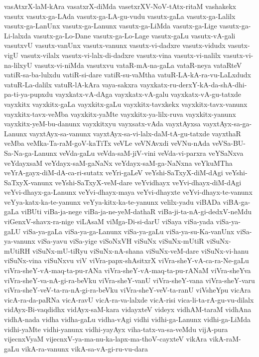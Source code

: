 {vasAtxrX-laM-kAra
vasatxrX-diMda
vasetxrXV-NoV-tAtx-ritaM
vashakekx
vasutx
vasutx-ga-LAda
vasutx-ga-LA-gu-vudu
vasutx-gaLa
vasutx-ga-Lalilx
vasutx-ga-LanUnx
vasutx-ga-Lanunx
vasutx-ga-LiMda
vasutx-ga-Lige
vasutx-ga-Li-lalxda
vasutx-ga-Lo-Dane
vasutx-ga-Lo-Lage
vasutx-gaLu
vasutx-vA-gali
vasutxvU
vasutx-vanUnx
vasutx-vanunx
vasutx-vi-dadxre
vasutx-vidudx
vasutx-vigU
vasutx-vilalx
vasutx-vi-lalx-di-dadxre
vasutx-vina
vasutx-vi-nalilx
vasutx-vi-na-lilxyU
vasutx-vi-niMda
vasutxvu
vataR-mA-na-gaLa
vataR-neya
vataRteV
vatiR-sa-ba-lulxdu
vatiR-si-dare
vatiR-su-vaMtha
vatuR-LA-kA-ra-vu-LaLxdudx
vatuR-La-dalilx
vatuR-lA-kAra
vaya-sakxra
vayxkatx-ru-derxY-kA-da-shA-dhi-pa-ti-ya-pupxdu
vayxkatx-vA-dAga
vayxkatx-vA-galu
vayxkatx-vA-gu-tatxde
vayxkitx
vayxkitx-gaLa
vayxkitx-gaLu
vayxkitx-tavxkekx
vayxkitx-tavx-vanunx
vayxkitx-tavx-veMba
vayxkitx-yaMte
vayxkitx-ya-lilx-ruva
vayxkitx-yanunx
vayxkitx-yeM-bu-danunx
vayxkitxyu
vayxsatx-vAda
vayxtAyxsa
vayxtAyx-sa-ga-Lanunx
vayxtAyx-sa-vanunx
vayxtAyx-sa-vi-lalx-daM-tA-gu-tatxde
vayxthaR
veMba
veMka-Ta-raM-goV-kaTiTx
veVLe
veVNAvxdi
veVNu-nAda
veVSa-BU-Sa-Na-ga-Lanunx
veVda-gaLu
veVda-saM-jiV-vini
veVda-vi-parxra
veYSaNxva
veYdayxsaM
veYdayx-saM-gaNaNx
veYdayx-saM-ga-NaNxna
veYkuMTha
veYrA-gayx-diM-dA-ca-ri-sutatx
veYri-gaLeV
veYshi-SaTxyX-diM-dAgi
veYshi-SaTxyX-vanunx
veYshi-SaTxyX-veM-dare
veYvidhayx
veYvi-dhayx-diM-dAgi
veYvi-dhayx-ga-Lanunx
veYvi-dhayx-maya
veYvi-dhayxte
veYvi-dhayx-te-vanunx
veYya-katx-ka-te-yanunx
veYya-kitx-ka-te-yanunx
velilx-yadu
viBADa
viBA-ga-gaLa
viBUti
viBa-ja-nege
viBa-ja-ne-yeM-dathaR
viBa-ji-ta-nA-gi-dedxV-neMdu
viGenxV-shavx-ra-nige
viLAsaM
viMga-Di-si-darU
viSaya
viSa-yada
viSa-ya-gaLU
viSa-ya-gaLa
viSa-ya-ga-Lanunx
viSa-ya-gaLu
viSa-ya-su-Ka-vanUnx
viSa-ya-vanunx
viSa-yavu
viSa-yige
viSoNxVH
viSuNx
viSuNx-mUtiR
viSuNx-mUtiRH
viSuNx-mU-tiRyu
viSuNx-nA-shana
viSuNx-veM-dare
viSuNx-vi-hanu
viSuNx-vina
viSuNxvu
viV
viVra-papx-shAsitxrX
viVra-sheY-vA-ca-ra-Ne-gaLu
viVra-sheY-vA-maq-ta-pu-rANa
viVra-sheY-vA-maq-ta-pu-rANaM
viVra-sheYva
viVra-sheY-va-nA-gi-ra-beVku
viVra-sheY-vanU
viVra-sheY-vana
viVra-sheY-varu
viVra-sheY-veV-ta-ra-nA-gi-ra-beVku
viVra-sheY-veV-ta-ranU
viVsheYpu
vicAra
vicA-ra-da-paRNa
vicA-ravU
vicA-ra-va-lalxde
vicA-risi
vica-li-ta-rA-gu-vu-dilalx
vidAyx-Bi-vaqdidhx
vidAyx-saM-kara
vidayxteV
videyx
vidhAM-taraM
vidhAna
vidhA-nada
vidha
vidha-gaLu
vidha-vAgi
vidhi
vidhi-ga-Lanunx
vidhi-ga-LiMda
vidhi-yaMte
vidhi-yanunx
vidhi-yayAyx
viha-tatx-va-sa-veMdu
vijA-pura
vijecnxVyaM
vijecnxV-ya-ma-nu-ka-lapx-ma-thoV-cayxteV
vikAra
vikA-raM-gaLu
vikA-ra-vanunx
vikA-sa-vA-gi-ru-vu-dara
}
